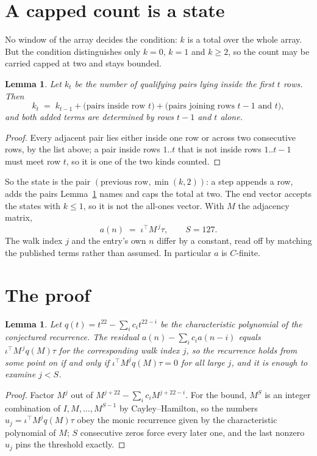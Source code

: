 \documentclass[11pt,a4paper]{article}
\theoremstyle{plain}
\newtheorem{lemma}[theorem]{Lemma}
\theoremstyle{definition}
\begin{document}
\section{A capped count is a state}

No window of the array decides the condition: $k$ is a total over the whole array. But the
condition distinguishes only $k=0$, $k=1$ and $k\ge2$, so the count may be carried capped at
two and stays bounded.

\begin{lemma}\label{lem:cap}
Let $k_t$ be the number of qualifying pairs lying inside the first $t$ rows. Then
\[
k_{t}\;=\;k_{t-1}+\bigl(\text{pairs inside row } t\bigr)
+\bigl(\text{pairs joining rows } t-1 \text{ and } t\bigr),
\]
and both added terms are determined by rows $t-1$ and $t$ alone.
\end{lemma}

\begin{proof}
Every adjacent pair lies either inside one row or across two consecutive rows, by the list
above; a pair inside rows $1..t$ that is not inside rows $1..t-1$ must meet row $t$, so it is
one of the two kinds counted.
\end{proof}

So the state is the pair $(\text{previous row},\min(k,2))$: a step appends a row, adds the
pairs Lemma~\ref{lem:cap} names and caps the total at two. The end vector accepts the states
with $k\le1$, so it is not the all-ones vector. With $M$ the adjacency matrix,
\[
a(n)\;=\;\iota^{\!\top}M^{\,j}\tau ,\qquad S=127.
\]
The walk index $j$ and the entry's own $n$ differ by a constant, read off by matching the
published terms rather than assumed. In particular $a$ is $C$-finite.

\section{The proof}

\begin{lemma}\label{lem:crit}
Let $q(t)=t^{22}-\sum_i c_it^{22-i}$ be the characteristic polynomial of the
conjectured recurrence. The residual $a(n)-\sum_ic_ia(n-i)$ equals
$\iota^{\!\top}M^{\,j}q(M)\tau$ for the corresponding walk index $j$, so the recurrence
holds from some point on if and only if $\iota^{\!\top}M^{j}q(M)\tau=0$ for all large $j$,
and it is enough to examine $j<S$.
\end{lemma}

\begin{proof}
Factor $M^{j}$ out of $M^{j+22}-\sum_ic_iM^{j+22-i}$. For the bound, $M^{S}$
is an integer combination of $I,M,\dots,M^{S-1}$ by Cayley--Hamilton, so the numbers
$u_j=\iota^{\!\top}M^{j}q(M)\tau$ obey the monic recurrence given by the characteristic
polynomial of $M$; $S$ consecutive zeros force every later one, and the last nonzero $u_j$
pins the threshold exactly.
\end{proof}
\end{document}
